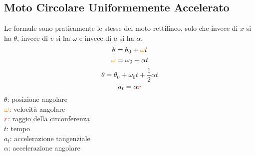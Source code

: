\subsection{Moto Circolare Uniformemente Accelerato}\label{subsec:cinematica:mrua}
\label{subsec:mrua}
Le formule sono praticamente le stesse del moto rettilineo, solo che invece di $x$ si ha $\theta$,
invece di $v$ si ha $\omega$ e invece di $a$ si ha $\alpha$.
\begin{equation*}
\theta = \theta_0 + \mathcolor{orange}{\omega}t
\end{equation*}
\begin{equation*}
\mathcolor{orange}{\omega} = \omega_0 + \alpha t
\end{equation*}
\begin{equation*}
\theta = \theta_0 + \omega_0t + \frac{1}{2}\alpha t
\end{equation*}
\begin{equation*}
a_t = \alpha \mathcolor{red}{r}
\end{equation*}
$\theta$: posizione angolare\\
$\mathcolor{orange}{\omega}$: velocità angolare\\
$\mathcolor{red}{r}$: raggio della circonferenza\\
$t$: tempo\\
$a_t$: accelerazione tangenziale\\
$\alpha$: accelerazione angolare
